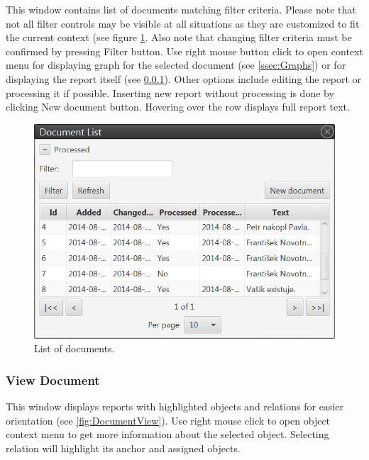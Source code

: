 This window contains list of documents matching filter criteria. Please note
that not all filter controls may be visible at all situations as they are
customized to fit the current context (see figure \ref{fig:DocumentList}.
Also note that changing filter criteria must be confirmed by pressing Filter
button. Use right mouse button click to open context menu for displaying graph
for the selected document (see \ref{ssec:Graphs}) or for displaying the report
itself (see \ref{sssec:DocumentView}). Other options include editing the report
or processing it if possible. Inserting new report without processing is done
by clicking New document button. Hovering over the row displays full report
text.

\begin{figure}[!htb]
        \centering
        \includegraphics[width=\textwidth]{Images/documentlist}
        \caption{List of documents.}
        \label{fig:DocumentList}
\end{figure}

\subsubsection{View Document}
\label{sssec:DocumentView}

This window displays reports with highlighted objects and relations for easier
orientation (see \ref{fig:DocumentView}). Use right mouse click to open object
context menu to get more information about the selected object. Selecting
relation will highlight its anchor and assigned objects.

